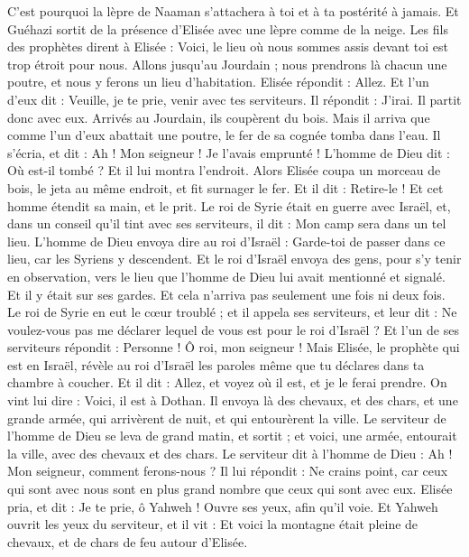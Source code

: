 \begin{multicols}{2}
C’est pourquoi la lèpre de Naaman s’attachera à toi et à ta postérité à jamais. Et Guéhazi sortit de la présence d’Elisée avec une lèpre comme de la neige.
\VerseOne{}Les fils des prophètes dirent à Elisée : Voici, le lieu où nous sommes assis devant toi est trop étroit pour nous.
Allons jusqu’au Jourdain ; nous prendrons là chacun une poutre, et nous y ferons un lieu d’habitation. Elisée répondit : Allez.
Et l’un d’eux dit : Veuille, je te prie, venir avec tes serviteurs. Il répondit : J’irai.
Il partit donc avec eux. Arrivés au Jourdain, ils coupèrent du bois.
Mais il arriva que comme l’un d’eux abattait une poutre, le fer de sa cognée tomba dans l’eau. Il s’écria, et dit : Ah ! Mon seigneur ! Je l’avais emprunté !
L’homme de Dieu dit : Où est-il tombé ? Et il lui montra l’endroit. Alors Elisée coupa un morceau de bois, le jeta au même endroit, et fit surnager le fer.
Et il dit : Retire-le ! Et cet homme étendit sa main, et le prit.
Le roi de Syrie était en guerre avec Israël, et, dans un conseil qu’il tint avec ses serviteurs, il dit : Mon camp sera dans un tel lieu.
L’homme de Dieu envoya dire au roi d’Israël : Garde-toi de passer dans ce lieu, car les Syriens y descendent.
Et le roi d’Israël envoya des gens, pour s’y tenir en observation, vers le lieu que l’homme de Dieu lui avait mentionné et signalé. Et il y était sur ses gardes. Et cela n’arriva pas seulement une fois ni deux fois.
Le roi de Syrie en eut le cœur troublé ; et il appela ses serviteurs, et leur dit : Ne voulez-vous pas me déclarer lequel de vous est pour le roi d’Israël ?
Et l’un de ses serviteurs répondit : Personne ! Ô roi, mon seigneur ! Mais Elisée, le prophète qui est en Israël, révèle au roi d’Israël les paroles même que tu déclares dans ta chambre à coucher.
Et il dit : Allez, et voyez où il est, et je le ferai prendre. On vint lui dire : Voici, il est à Dothan.
Il envoya là des chevaux, et des chars, et une grande armée, qui arrivèrent de nuit, et qui entourèrent la ville.
Le serviteur de l’homme de Dieu se leva de grand matin, et sortit ; et voici, une armée, entourait la ville, avec des chevaux et des chars. Le serviteur dit à l’homme de Dieu : Ah ! Mon seigneur, comment ferons-nous ?
Il lui répondit : Ne crains point, car ceux qui sont avec nous sont en plus grand nombre que ceux qui sont avec eux.
Elisée pria, et dit : Je te prie, ô Yahweh ! Ouvre ses yeux, afin qu’il voie. Et Yahweh ouvrit les yeux du serviteur, et il vit : Et voici la montagne était pleine de chevaux, et de chars de feu autour d’Elisée.

\end{multicols}
